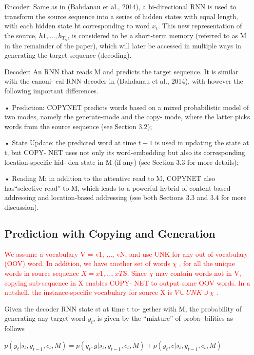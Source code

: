 \documentclass[UTF8]{ctexart}
\begin{document}
    Encoder: Same as in (Bahdanau et al., 2014), a
    bi-directional RNN is used to transform the source
    sequence into a series of hidden states with equal
    length, with each hidden state ht corresponding to
    word $x_t$. This new representation of the source,
    ${h1, ..., h_{T_S}}$, is considered to be a short-term
    memory (referred to as M in the remainder of the
    paper), which will later be accessed in multiple
    ways in generating the target sequence (decoding).

    Decoder: An RNN that reads M and predicts
    the target sequence. It is similar with the canoni-
    cal RNN-decoder in (Bahdanau et al., 2014), with
    however the following important differences.

    • Prediction: COPYNET predicts words based
    on a mixed probabilistic model of two modes,
    namely the generate-mode and the copy-
    mode, where the latter picks words from the
    source sequence (see Section 3.2);

    • State Update: the predicted word at time $t−1$
    is used in updating the state at t, but COPY-
    NET uses not only its word-embedding but
    also its corresponding location-specific hid-
    den state in M (if any) (see Section 3.3 for
    more details);

    • Reading M: in addition to the attentive read
    to M, COPYNET also has“selective read”
    to M, which leads to a powerful hybrid of
    content-based addressing and location-based
    addressing (see both Sections 3.3 and 3.4 for
    more discussion).


    \subsection{Prediction with Copying and Generation}
    \textcolor{red}{We assume a vocabulary V = {v1, ..., vN}, and use UNK for any out-of-vocabulary (OOV) word.
    In addition, we have another set of words $\chi$ , for
    all the unique words in source sequence $X =
    {x1, ..., xTS}$. Since $\chi$ may contain words not
    in V, copying sub-sequence in X enables COPY-
    NET to output some OOV words. In a nutshell,
    the instance-specific vocabulary for source X is
    $V \cup UNK \cup  \chi $ }.

    Given the decoder RNN state st at time t to-
    gether with M, the probability of generating any
    target word $y_t$, is given by the “mixture” of proba-
    bilities as follows

    $   p(y_t| s_t,y_{t-1},c_t,M)=p(y_t,g|s_t,y_{t-1},c_t,M)+p(y_t,c|s_t,y_{t-1},c_t,M)                       $
\end{document}
